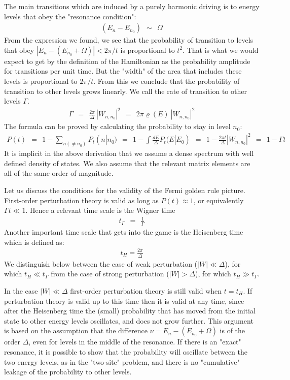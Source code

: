 \documentclass[onecolumn,fleqn, 11pt]{revtex4}
\newcommand{\gdos}{\varrho} \newcommand{\EPS}{\mathcal{E}}
\newcommand{\beq}{\begin{eqnarray}}
\newcommand{\eeq}{\end{eqnarray}}
\begin{document}
The main transitions which are induced by a purely harmonic driving  
is to energy levels that obey the "resonance condition":
\beq
(E_n-E_{n_0}) \ \ \sim \ \ \Omega 
\eeq
From the expression we found, we see that 
the probability of transition to levels that obey 
${|E_n-(E_{n_0}+\Omega)| < 2\pi/t}$ 
is proportional to ${t^2}$. That is what 
we would expect to get by the definition 
of the Hamiltonian as the probability amplitude 
for transitions per unit time. But the "width" 
of the area that includes these levels is proportional 
to ${2\pi/t}$. From this we conclude that the 
probability of transition to other levels grows linearly. 
We call the rate of transition to other levels ${\Gamma}$.  
\beq
\Gamma \ \ = \ \  
\frac{2\pi}{\Delta} \, |W_{n,n_0}|^2 
\ \ = \ \  
2\pi \gdos(E) \ |W_{n,n_0}|^2 
\eeq
The formula can be proved by calculating 
the probability to stay in level ${n_0}$:
\beq
P(t) \ \ = \ \ 1-\sum_{n (\neq n_0)} P_t(n|n_0) 
\ \ = \ \ 1-\int \frac {dE}{\Delta} P_t(E|E_0) 
\ \ = \ \ 1-\frac{2\pi t}{\Delta}|W_{n,n_0}|^2 
\ \ = \ \ 1-\Gamma t 
\eeq
It is implicit in the above derivation that we assume 
a dense spectrum with well defined density of states. 
We also assume that the relevant matrix elements are 
all of the same order of magnitude. 


Let us discuss the conditions for the validity 
of the Fermi golden rule picture. 
First-order perturbation theory is valid 
as long as  ${P(t) \approx 1}$, 
or equivalently ${\Gamma t \ll 1}$. 
Hence a relevant time scale is the Wigner time   
\beq
t_{\Gamma} \ \ = \ \ \frac{1}{\Gamma}
\eeq
Another important time scale that gets into 
the game is the Heisenberg time which is defined as: 
\beq
t_H =\frac {2\pi}{\Delta} 
\eeq
We distinguish below between the  
case of weak perturbation (${|W| \ll \Delta}$),
for which $t_H \ll t_{\Gamma}$  
from the case of strong perturbation (${|W| > \Delta}$), 
for which $t_H \gg t_{\Gamma}$.


In the case  ${|W| \ll \Delta}$ first-order perturbation theory 
is still valid when ${t=t_H}$. 
If perturbation theory is valid up to this time 
then it is valid at any time, since after 
the Heisenberg time the (small) probability that 
has moved from the initial state to other energy 
levels oscillates, and does not grow further. 
This argument is based on the assumption  
that the difference ${\nu = E_n-(E_{n_0} + \Omega)}$ 
is of the order ${\Delta}$, even for levels 
in the middle of the resonance. If there is 
an "exact" resonance, it is possible to show 
that the probability will oscillate between 
the two energy levels, as in the "two-site" 
problem, and there is no "cumulative" leakage 
of the probability to other levels. 
\end{document}
